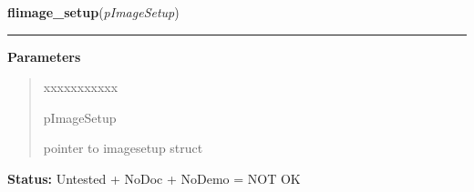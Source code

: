 \hspace{.8\funcindent}\begin{boxedminipage}{\funcwidth}

    \raggedright \textbf{flimage\_setup}(\textit{pImageSetup})

    \vspace{-1.5ex}

    \rule{\textwidth}{0.5\fboxrule}
\setlength{\parskip}{2ex}
\setlength{\parskip}{1ex}
      \textbf{Parameters}
      \vspace{-1ex}

      \begin{quote}
        \begin{Ventry}{xxxxxxxxxxx}

          \item[pImageSetup]

          pointer to imagesetup struct

        \end{Ventry}

      \end{quote}

\textbf{Status:} Untested + NoDoc + NoDemo = NOT OK



    \end{boxedminipage}

    \label{xformslib:flflimage:flimage_load}

    \vspace{0.5ex}

